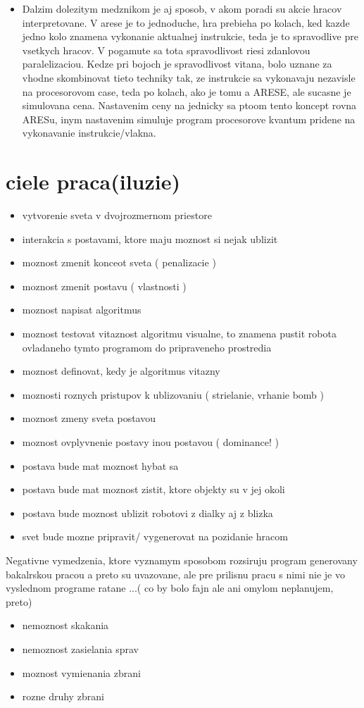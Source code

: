 \documentclass[12pt,notitlepage]{report}
\begin{document}
\begin{itemize}
\item Dalzim dolezitym medznikom je aj sposob, v akom poradi su akcie hracov interpretovane. V arese je to jednoduche, hra prebieha po kolach, ked kazde jedno kolo znamena vykonanie aktualnej instrukcie, teda je to spravodlive pre vsetkych hracov. V pogamute sa tota spravodlivost riesi zdanlovou paralelizaciou. Kedze pri bojoch je spravodlivost vitana, bolo uznane za vhodne skombinovat tieto techniky tak, ze instrukcie sa vykonavaju nezavisle na procesorovom case, teda po kolach, ako je tomu a ARESE, ale sucasne je simulovana cena. Nastavenim ceny na jednicky sa ptoom tento koncept rovna ARESu, inym nastavenim simuluje program procesorove kvantum pridene na vykonavanie instrukcie/vlakna.
\end{itemize}
\section{ciele praca(iluzie)}
\begin{itemize}
\item vytvorenie sveta v dvojrozmernom priestore
\item interakcia s postavami, ktore maju moznost si nejak ublizit
\item moznost zmenit konceot sveta ( penalizacie )
\item moznost zmenit postavu ( vlastnosti )
\item moznost napisat algoritmus
\item moznost testovat vitaznost algoritmu visualne, to znamena pustit robota ovladaneho tymto programom do pripraveneho prostredia
\item moznost definovat, kedy je algoritmus vitazny
\item moznosti roznych pristupov k ublizovaniu ( strielanie, vrhanie bomb )
\item moznost zmeny sveta postavou
\item moznost ovplyvnenie postavy inou postavou ( dominance! )
\item postava bude mat moznost hybat sa
\item postava bude mat moznost zistit, ktore objekty su v jej okoli
\item postava bude moznost ublizit robotovi z dialky aj z blizka
\item svet bude mozne pripravit/ vygenerovat na pozidanie hracom
\end{itemize}
Negativne vymedzenia, ktore vyznamym sposobom rozsiruju program generovany bakalrskou pracou a preto su uvazovane, ale pre prilisnu pracu s nimi nie je vo vyslednom programe ratane ...( co by bolo fajn ale ani omylom neplanujem, preto)
\begin{itemize}
\item nemoznost skakania 
\item nemoznost zasielania sprav
\item moznost vymienania zbrani
\item rozne druhy zbrani
\end{itemize}
\end{document}

